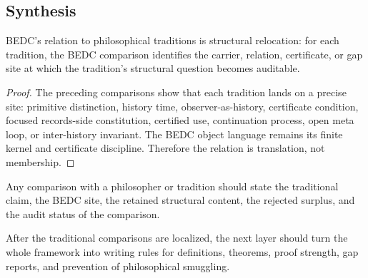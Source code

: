 \subsection{Synthesis}
\label{subsec:philosophy-traditions-synthesis}

\begin{theorem}
\label{thm:philosophy-traditions-synthesis}
BEDC's relation to philosophical traditions is structural relocation:
for each tradition, the BEDC comparison identifies the carrier,
relation, certificate, or gap site at which the tradition's structural
question becomes auditable.
\end{theorem}
\begin{proof}
The preceding comparisons show that each tradition lands on a precise
site: primitive distinction, history time, observer-as-history,
certificate condition, focused records-side constitution, certified
use, continuation process, open meta loop, or inter-history invariant.
The BEDC object language remains its finite kernel and certificate
discipline. Therefore the relation is translation, not membership.
\end{proof}

\begin{corollary}
\label{cor:philosophy-comparative-writing-discipline}
Any comparison with a philosopher or tradition should state the
traditional claim, the BEDC site, the retained structural content, the
rejected surplus, and the audit status of the comparison.
\end{corollary}

\begin{corollary}
\label{cor:philosophy-passage-to-audit-methodology}
After the traditional comparisons are localized, the next layer should
turn the whole framework into writing rules for definitions, theorems,
proof strength, gap reports, and prevention of philosophical smuggling.
\end{corollary}
